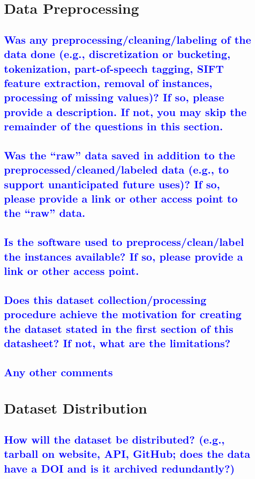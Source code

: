 \documentclass[letterpaper, 10 pt, conference]{ieeeconf}  %
\begin{document}
\section{Data Preprocessing}

\textcolor{blue}{\subsection{Was any preprocessing/cleaning/labeling of the data done (e.g., discretization or bucketing, tokenization, part-of-speech tagging, SIFT
feature extraction, removal of instances, processing of missing values)? If so, please provide a description. If not, you may skip the remainder of the questions in this section.}}
\lipsum[1]


\textcolor{blue}{\subsection{Was the “raw” data saved in addition to the preprocessed/cleaned/labeled data (e.g., to support unanticipated
future uses)? If so, please provide a link or other access point to the
“raw” data.}}
\lipsum[1]

\textcolor{blue}{\subsection{Is the software used to preprocess/clean/label the instances available? If so, please provide a link or other access point.}}
\lipsum[1]



\textcolor{blue}{\subsection{Does this dataset collection/processing procedure
achieve the motivation for creating the dataset
stated in the first section of this datasheet? If not,
what are the limitations?}}
\lipsum[1]


\textcolor{blue}{\subsection{Any other comments}}
\lipsum[1]

\section{Dataset Distribution}

\textcolor{blue}{\subsection{How will the dataset be distributed? (e.g., tarball on
website, API, GitHub; does the data have a DOI and is it
archived redundantly?)}}
\lipsum[1][1-10]
\end{document}
